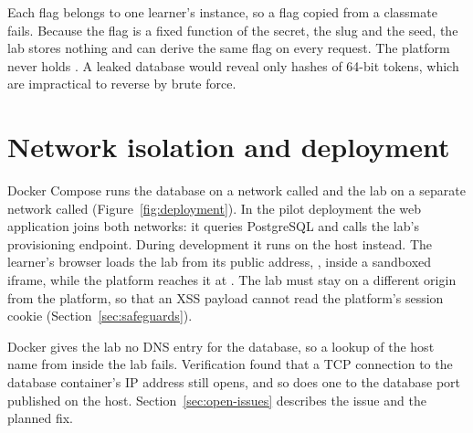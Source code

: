 Each flag belongs to one learner's instance, so a flag copied from a classmate fails. Because the flag is a fixed function of the secret, the slug and the seed, the lab stores nothing and can derive the same flag on every request. The platform never holds . A leaked database would reveal only hashes of 64-bit tokens, which are impractical to reverse by brute force.


\section{Network isolation and deployment}
\label{sec:deployment}

Docker Compose runs the database on a network called  and the lab on a separate network called  (Figure~\ref{fig:deployment}). In the pilot deployment the web application joins both networks: it queries PostgreSQL and calls the lab's provisioning endpoint. During development it runs on the host instead. The learner's browser loads the lab from its public address, , inside a sandboxed iframe, while the platform reaches it at . The lab must stay on a different origin from the platform, so that an XSS payload cannot read the platform's session cookie (Section~\ref{sec:safeguards}).

Docker gives the lab no DNS entry for the database, so a lookup of the host name  from inside the lab fails. Verification found that a TCP connection to the database container's IP address still opens, and so does one to the database port published on the host. Section~\ref{sec:open-issues} describes the issue and the planned fix.


